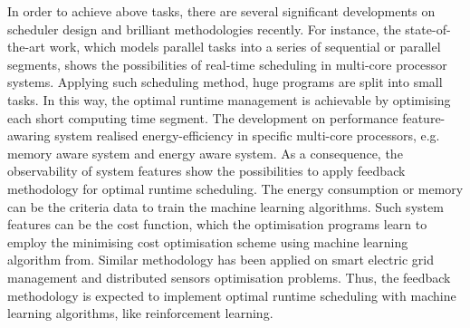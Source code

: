 In order to achieve above tasks, there are several significant developments on scheduler design and brilliant methodologies recently. For instance, the state-of-the-art work, which models parallel tasks into a series of sequential or parallel segments, shows the possibilities of real-time scheduling in multi-core processor systems\cite{realtimeschedulea}\cite{realtimescheduleb}. Applying such scheduling method, huge programs are split into small tasks. In this way, the optimal runtime management is achievable by optimising each short computing time segment. The development on performance feature-awaring system realised energy-efficiency in specific multi-core processors, e.g. memory aware system\cite{memaw} and energy aware system\cite{energyaw}. As a consequence, the observability of system features show the possibilities to apply feedback methodology for optimal runtime scheduling. The energy consumption or memory can be the criteria data to train the machine learning algorithms. Such system features can be the cost function, which the optimisation programs learn to employ the minimising cost optimisation scheme using machine learning algorithm from. Similar methodology has been applied on smart electric grid management\cite{powergrid} and distributed sensors optimisation problems\cite{distributedsensors}. Thus, the feedback methodology is expected to implement optimal runtime scheduling with machine learning algorithms, like reinforcement learning.





